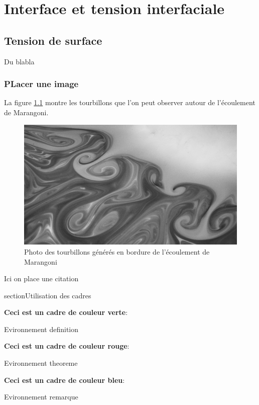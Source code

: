 \part{Interface et tension interfaciale}

\chapter{Tension de surface}

Du blabla

\section{PLacer une image}

La figure \ref{fig:TourbillonsDeMarangoni} montre les tourbillons que l'on peut observer autour de l'écoulement de Marangoni.

\begin{figure}[!ht]
  \centering
  \includegraphics*[scale = .8]{./figures/chap1/Tourbillons_Marangoni.png}
  \caption{Photo des tourbillons générés en bordure de l'écoulement de Marangoni}
  \label{fig:TourbillonsDeMarangoni}
\end{figure}

Ici on place une citation \cite{le2021surface}

\clearpage
section{Utilisation des cadres}


\begin{ombredef}
  \begin{definition}
    \textbf{Ceci est un cadre de couleur verte}:\bigskip

    Evironnement definition
  \end{definition}
\end{ombredef}


\begin{ombretheo}
  \begin{theo}
    \textbf{Ceci est un cadre de couleur rouge}:\bigskip

    Evironnement theoreme
  \end{theo}
\end{ombretheo}



\begin{ombreremarque}
  \begin{remarque}
    \textbf{Ceci est un cadre de couleur bleu}:\bigskip

    Evironnement remarque
  \end{remarque}
\end{ombreremarque}

